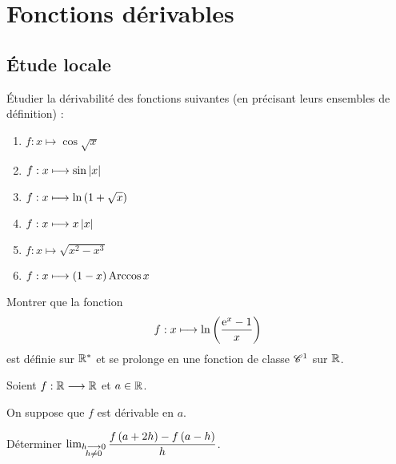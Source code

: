 \chapter{Fonctions dérivables}

\minitoc

\section{Étude locale}

\begin{exo}
Étudier la dérivabilité des fonctions suivantes (en précisant leurs ensembles de définition) :

\begin{enumerate}
\item \(f:x\mapsto\cos\sqrt{x}\) \\

\item \(f:x\longmapsto\sin\left\lvert x\right\rvert\) \\

\item \(f:x\longmapsto\ln\left(1+\sqrt{x}\right)\) \\

\item \(f:x\longmapsto x\left\lvert x\right\rvert\) \\

\item \(f:x\mapsto\sqrt{x^2-x^3}\) \\

\item \(f:x\longmapsto\left(1-x\right)\operatorname{Arccos} x\)
\end{enumerate}
\end{exo}

\begin{corr}
\end{corr}

\begin{exo}
Montrer que la fonction \[f:x\longmapsto\ln\left(\dfrac{\mathrm{e}^{x}-1}{x}\right)\] est définie sur \(\mathbb{R}^*\) et se prolonge en une fonction de classe \(\mathscr{C}^{1}\) sur \(\mathbb{R}\).
\end{exo}

\begin{corr}
\end{corr}

\begin{exo}
Soient \(f:\mathbb{R}\longrightarrow\mathbb{R}\) et \(a\in\mathbb{R}\).

On suppose que \(f\) est dérivable en \(a\).

Déterminer \(\lim_{\substack{h\longrightarrow0 \\ h\not=0}}\dfrac{f\left(a+2h\right)-f\left(a-h\right)}{h}\).
\end{exo}

